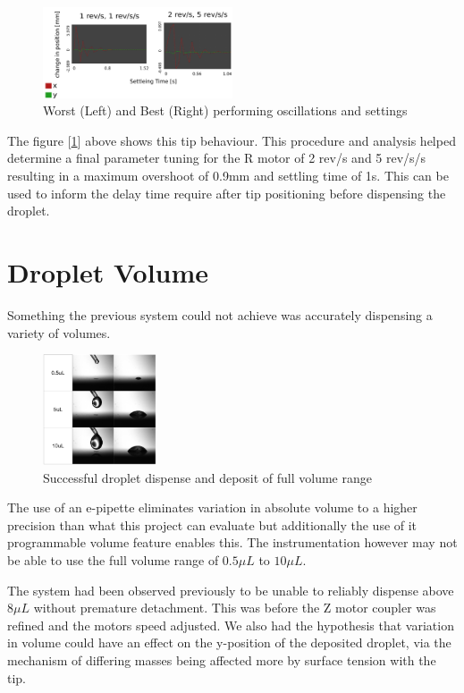 \begin{figure}[h]
    \centering
    \includegraphics[width=0.5\textwidth]{img/param_sweep_osc.png}
    \caption{Worst (Left) and Best (Right) performing oscillations and settings}
    \label{Fig:tip_osc}
\end{figure}

The figure [\ref{Fig:tip_osc}] above shows this tip behaviour. This procedure and analysis helped determine a final parameter tuning for the R motor of 2 rev/s and 5 rev/s/s resulting in a maximum overshoot of 0.9mm and settling time of 1s. This can be used to inform the delay time require after tip positioning before dispensing the droplet.

\section{Droplet Volume}

Something the previous system could not achieve was accurately dispensing a variety of volumes.

\begin{figure}
    \centering
    \includegraphics[width=0.3\textwidth]{img/volume_range.png}
    \caption{Successful droplet dispense and deposit of full volume range}
    \label{fig:vol_var}
\end{figure}

The use of an e-pipette eliminates variation in absolute volume to a higher precision than what this project can evaluate but additionally the use of it programmable volume feature enables this. The instrumentation however may not be able to use the full volume range of $0.5\mu L$ to $10\mu L$.

The system had been observed previously to be unable to reliably dispense above $8\mu L$ without premature detachment. This was before the Z motor coupler was refined and the motors speed adjusted.
We also had the hypothesis that variation in volume could have an effect on the y-position of the deposited droplet, via the mechanism of differing masses being affected more by surface tension with the tip.

